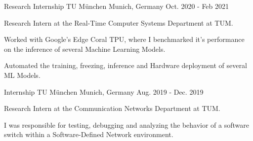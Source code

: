 \begin{cventries}
  \cventry
    {Research Internship} %
    {TU München} %
    {Munich, Germany} %
    {Oct. 2020 - Feb 2021} %
    {
      \begin{cvitems} %
        \item {Research Intern at the Real-Time Computer Systems Department at TUM. }
        \item {Worked with Google’s Edge Coral TPU, where I benchmarked it's 
               performance on the inference of several Machine Learning Models.}
        \item {Automated the training, freezing, inference and Hardware deployment of several ML Models.}
      \end{cvitems}
    }

  \cventry
    {Internship} %
    {TU München} %
    {Munich, Germany} %
    {Aug. 2019 - Dec. 2019} %
    {
      \begin{cvitems} %
        \item {Research Intern at the Communication Networks Department at TUM. }
        \item {I was responsible for testing, debugging and analyzing the behavior 
               of a software switch within a Software-Defined Network environment.}
      \end{cvitems}
    }

  \cventry
    {} %
    {} %
    {} %
    {} %
    { }
\end{cventries}
